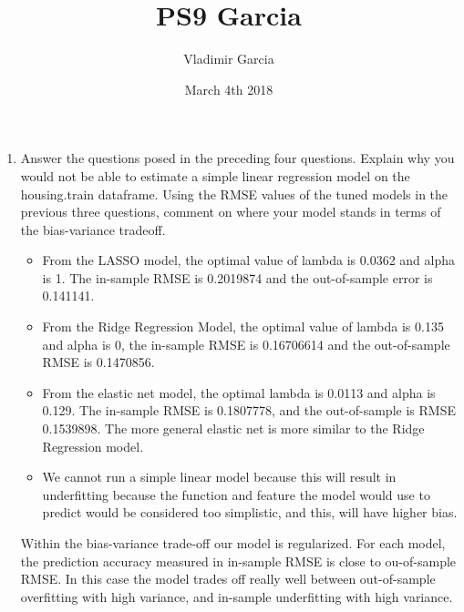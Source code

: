 \documentclass{article}
\title{PS9 Garcia}
\author{Vladimir Garcia}
\date{March 4th 2018}
\begin{document}
\maketitle
\begin{enumerate}
    \item Answer the questions posed in the preceding four questions. Explain why you would not be able to estimate a simple linear regression model on the housing.train dataframe. Using the RMSE values of the tuned models in the previous three questions, comment on where your model stands in terms of the bias-variance tradeoff.
    \begin{itemize}
        \item From the LASSO model, the optimal value of lambda is 0.0362 and alpha is 1. The in-sample RMSE is 0.2019874 and the out-of-sample error is 0.141141. 
        \item From the Ridge Regression Model, the optimal value of lambda is 0.135 and alpha is 0, the in-sample RMSE is 0.16706614 and the out-of-sample RMSE is 0.1470856.
        \item From the elastic net model, the optimal lambda is 0.0113 and alpha is 0.129. The in-sample RMSE is 0.1807778, and the out-of-sample is RMSE 0.1539898. The more general elastic net is more similar to the Ridge Regression model. 
        \item We cannot run a simple linear model because this will result in underfitting because the function and feature the model would use to predict would be considered too simplistic, and this, will have higher bias. 
    \end{itemize}
    Within the bias-variance trade-off our model is regularized. For each model, the prediction accuracy measured in in-sample RMSE is close to ou-of-sample RMSE. In this case the model trades off really well between out-of-sample overfitting with high variance, and in-sample underfitting with high variance.
\end{enumerate}
\end{document}
